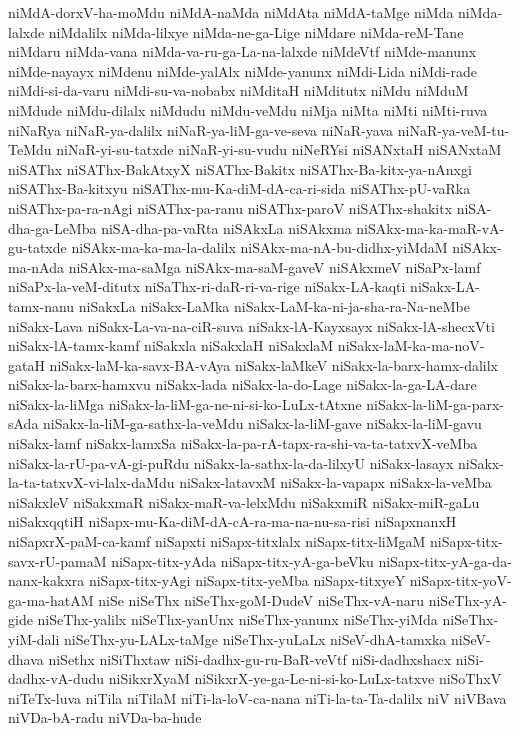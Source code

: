 {niMdA-dorxV-ha-moMdu
niMdA-naMda
niMdAta
niMdA-taMge
niMda
niMda-lalxde
niMdalilx
niMda-lilxye
niMda-ne-ga-Lige
niMdare
niMda-reM-Tane
niMdaru
niMda-vana
niMda-va-ru-ga-La-na-lalxde
niMdeVtf
niMde-manunx
niMde-nayayx
niMdenu
niMde-yalAlx
niMde-yanunx
niMdi-Lida
niMdi-rade
niMdi-si-da-varu
niMdi-su-va-nobabx
niMditaH
niMditutx
niMdu
niMduM
niMdude
niMdu-dilalx
niMdudu
niMdu-veMdu
niMja
niMta
niMti
niMti-ruva
niNaRya
niNaR-ya-dalilx
niNaR-ya-liM-ga-ve-seva
niNaR-yava
niNaR-ya-veM-tu-TeMdu
niNaR-yi-su-tatxde
niNaR-yi-su-vudu
niNeRYsi
niSANxtaH
niSANxtaM
niSAThx
niSAThx-BakAtxyX
niSAThx-Bakitx
niSAThx-Ba-kitx-ya-nAnxgi
niSAThx-Ba-kitxyu
niSAThx-mu-Ka-diM-dA-ca-ri-sida
niSAThx-pU-vaRka
niSAThx-pa-ra-nAgi
niSAThx-pa-ranu
niSAThx-paroV
niSAThx-shakitx
niSA-dha-ga-LeMba
niSA-dha-pa-vaRta
niSAkxLa
niSAkxma
niSAkx-ma-ka-maR-vA-gu-tatxde
niSAkx-ma-ka-ma-la-dalilx
niSAkx-ma-nA-bu-didhx-yiMdaM
niSAkx-ma-nAda
niSAkx-ma-saMga
niSAkx-ma-saM-gaveV
niSAkxmeV
niSaPx-lamf
niSaPx-la-veM-ditutx
niSaThx-ri-daR-ri-va-rige
niSakx-LA-kaqti
niSakx-LA-tamx-nanu
niSakxLa
niSakx-LaMka
niSakx-LaM-ka-ni-ja-sha-ra-Na-neMbe
niSakx-Lava
niSakx-La-va-na-ciR-suva
niSakx-lA-Kayxsayx
niSakx-lA-shecxVti
niSakx-lA-tamx-kamf
niSakxla
niSakxlaH
niSakxlaM
niSakx-laM-ka-ma-noV-gataH
niSakx-laM-ka-savx-BA-vAya
niSakx-laMkeV
niSakx-la-barx-hamx-dalilx
niSakx-la-barx-hamxvu
niSakx-lada
niSakx-la-do-Lage
niSakx-la-ga-LA-dare
niSakx-la-liMga
niSakx-la-liM-ga-ne-ni-si-ko-LuLx-tAtxne
niSakx-la-liM-ga-parx-sAda
niSakx-la-liM-ga-sathx-la-veMdu
niSakx-la-liM-gave
niSakx-la-liM-gavu
niSakx-lamf
niSakx-lamxSa
niSakx-la-pa-rA-tapx-ra-shi-va-ta-tatxvX-veMba
niSakx-la-rU-pa-vA-gi-puRdu
niSakx-la-sathx-la-da-lilxyU
niSakx-lasayx
niSakx-la-ta-tatxvX-vi-lalx-daMdu
niSakx-latavxM
niSakx-la-vapapx
niSakx-la-veMba
niSakxleV
niSakxmaR
niSakx-maR-va-lelxMdu
niSakxmiR
niSakx-miR-gaLu
niSakxqqtiH
niSapx-mu-Ka-diM-dA-cA-ra-ma-na-nu-sa-risi
niSapxnanxH
niSapxrX-paM-ca-kamf
niSapxti
niSapx-titxlalx
niSapx-titx-liMgaM
niSapx-titx-savx-rU-pamaM
niSapx-titx-yAda
niSapx-titx-yA-ga-beVku
niSapx-titx-yA-ga-da-nanx-kakxra
niSapx-titx-yAgi
niSapx-titx-yeMba
niSapx-titxyeY
niSapx-titx-yoV-ga-ma-hatAM
niSe
niSeThx
niSeThx-goM-DudeV
niSeThx-vA-naru
niSeThx-yA-gide
niSeThx-yalilx
niSeThx-yanUnx
niSeThx-yanunx
niSeThx-yiMda
niSeThx-yiM-dali
niSeThx-yu-LALx-taMge
niSeThx-yuLaLx
niSeV-dhA-tamxka
niSeV-dhava
niSethx
niSiThxtaw
niSi-dadhx-gu-ru-BaR-veVtf
niSi-dadhxshacx
niSi-dadhx-vA-dudu
niSikxrXyaM
niSikxrX-ye-ga-Le-ni-si-ko-LuLx-tatxve
niSoThxV
niTeTx-luva
niTila
niTilaM
niTi-la-loV-ca-nana
niTi-la-ta-Ta-dalilx
niV
niVBava
niVDa-bA-radu
niVDa-ba-hude
}
